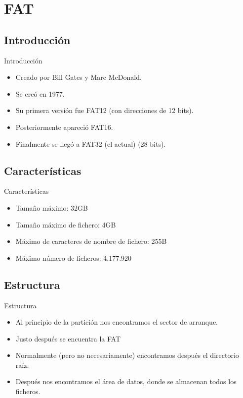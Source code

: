 \section{FAT}
\subsection{Introducción}
\begin{frame}{Introducción}
  \begin{itemize}
    \item Creado por Bill Gates y Marc McDonald.
    \item Se creó en 1977.
    \item Su primera versión fue FAT12 (con direcciones de 12 bits).
    \item Posteriormente apareció FAT16.
    \item Finalmente se llegó a FAT32 (el actual) (28 bits).
  \end{itemize}
\end{frame}

\subsection{Características}
\begin{frame}{Características}
  \begin{itemize}
    \item Tamaño máximo: 32GB
    \item Tamaño máximo de fichero: 4GB
    \item Máximo de caracteres de nombre de fichero: 255B
    \item Máximo número de ficheros: 4.177.920
  \end{itemize}
\end{frame}

\subsection{Estructura}
\begin{frame}{Estructura}
  \begin{itemize}
    \item Al principio de la partición nos encontramos el sector de arranque.
    \item Justo después se encuentra la FAT
    \item Normalmente (pero no necesariamente) encontramos después el directorio raíz.
    \item Después nos encontramos el área de datos, donde se almacenan todos los ficheros.
  \end{itemize}
\end{frame}

